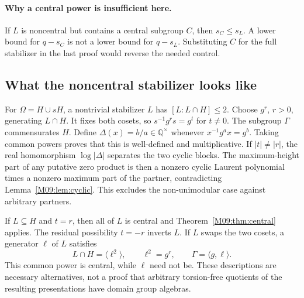 \documentclass[11pt,a4paper,oneside]{report}
\theoremstyle{definition}
\theoremstyle{remark}
\newcommand{\Q}{\mathbb Q}
\begin{document}
\paragraph{Why a central power is insufficient here.}
If $L$ is noncentral but contains a central subgroup $C$, then
$s_C\le s_L$. A lower bound for $q-s_C$ is not a lower bound
for $q-s_L$. Substituting $C$ for the full stabilizer in the last
proof would reverse the needed control.

\subsection{What the noncentral stabilizer looks like}
For $\Omega=H\cup sH$, a nontrivial stabilizer $L$ has
$[L:L\cap H]\le2$. Choose $g^r$, $r>0$, generating $L\cap H$. It fixes
both cosets, so $s^{-1}g^rs=g^t$ for $t\ne0$.
The subgroup $\Gamma$ commensurates $H$. Define
$\Delta(x)=b/a\in\Q^\times$ whenever
$x^{-1}g^ax=g^b$. Taking common powers proves that this is
well-defined and multiplicative. If $|t|\ne|r|$, the real
homomorphism $\log|\Delta|$ separates the two cyclic blocks.
The maximum-height part of any putative zero product is then
a nonzero cyclic Laurent polynomial times a nonzero maximum
part of the partner, contradicting Lemma~\ref{M09:lem:cyclic}.
This excludes the non-unimodular case against arbitrary partners.

If $L\subseteq H$ and $t=r$, then all of $L$ is central and
Theorem~\ref{M09:thm:central} applies. The residual possibility
$t=-r$ inverts $L$. If $L$ swaps the two cosets, a generator
$\ell$ of $L$ satisfies
\[
L\cap H=\langle\ell^2\rangle,\qquad
\ell^2=g^r,\qquad \Gamma=\langle g,\ell\rangle.
\]
This common power is central, while $\ell$ need not be.
These descriptions are necessary alternatives, not a proof
that arbitrary torsion-free quotients of the resulting
presentations have domain group algebras.
\end{document}
